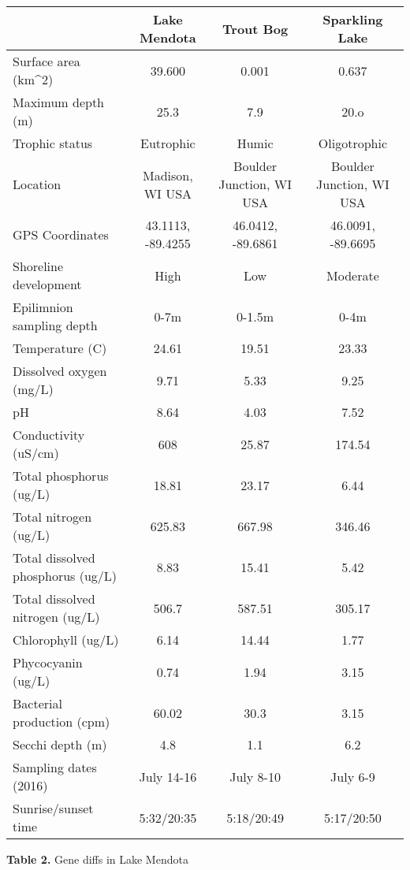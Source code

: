 \documentclass[]{article}
\begin{document}
\begin{longtable}[]{@{}lccc@{}}
\toprule
& Lake Mendota & Trout Bog & Sparkling Lake\tabularnewline
\midrule
\endhead
Surface area (km\^{}2) & 39.600 & 0.001 & 0.637\tabularnewline
Maximum depth (m) & 25.3 & 7.9 & 20.o\tabularnewline
Trophic status & Eutrophic & Humic & Oligotrophic\tabularnewline
Location & Madison, WI USA & Boulder Junction, WI USA & Boulder
Junction, WI USA\tabularnewline
GPS Coordinates & 43.1113, -89.4255 & 46.0412, -89.6861 & 46.0091,
-89.6695\tabularnewline
Shoreline development & High & Low & Moderate\tabularnewline
Epilimnion sampling depth & 0-7m & 0-1.5m & 0-4m\tabularnewline
Temperature (C) & 24.61 & 19.51 & 23.33\tabularnewline
Dissolved oxygen (mg/L) & 9.71 & 5.33 & 9.25\tabularnewline
pH & 8.64 & 4.03 & 7.52\tabularnewline
Conductivity (uS/cm) & 608 & 25.87 & 174.54\tabularnewline
Total phosphorus (ug/L) & 18.81 & 23.17 & 6.44\tabularnewline
Total nitrogen (ug/L) & 625.83 & 667.98 & 346.46\tabularnewline
Total dissolved phosphorus (ug/L) & 8.83 & 15.41 & 5.42\tabularnewline
Total dissolved nitrogen (ug/L) & 506.7 & 587.51 & 305.17\tabularnewline
Chlorophyll (ug/L) & 6.14 & 14.44 & 1.77\tabularnewline
Phycocyanin (ug/L) & 0.74 & 1.94 & 3.15\tabularnewline
Bacterial production (cpm) & 60.02 & 30.3 & 3.15\tabularnewline
Secchi depth (m) & 4.8 & 1.1 & 6.2\tabularnewline
Sampling dates (2016) & July 14-16 & July 8-10 & July 6-9\tabularnewline
Sunrise/sunset time & 5:32/20:35 & 5:18/20:49 &
5:17/20:50\tabularnewline
\bottomrule
\end{longtable}

\textbf{Table 2.} Gene diffs in Lake Mendota
\end{document}
